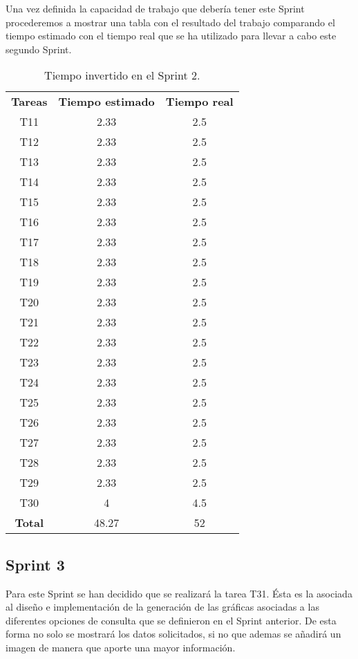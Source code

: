 Una vez definida la capacidad de trabajo que debería tener este Sprint procederemos a mostrar una tabla con el resultado del trabajo comparando el tiempo estimado con el tiempo real que se ha utilizado para llevar a cabo este segundo Sprint.

\begin{table}[H]
	\begin{center}
		\begin{tabular}{| c | c | c |}
			\hline

			\textbf{Tareas} & \textbf{Tiempo estimado} & \textbf{Tiempo real} \\
			T11 & 2.33 & 2.5 \\
			T12 & 2.33 & 2.5 \\
			T13 & 2.33 & 2.5 \\
			T14 & 2.33 & 2.5 \\
			T15 & 2.33 & 2.5 \\
			T16 & 2.33 & 2.5 \\
			T17 & 2.33 & 2.5 \\
			T18 & 2.33 & 2.5 \\
			T19 & 2.33 & 2.5 \\
			T20 & 2.33 & 2.5 \\
			T21 & 2.33 & 2.5 \\
			T22 & 2.33 & 2.5 \\
			T23 & 2.33 & 2.5 \\
			T24 & 2.33 & 2.5 \\
			T25 & 2.33 & 2.5 \\
			T26 & 2.33 & 2.5 \\
			T27 & 2.33 & 2.5 \\
			T28 & 2.33 & 2.5 \\
			T29 & 2.33 & 2.5 \\
			T30 & 4 & 4.5 \\
			\textbf{Total} & 48.27 & 52 \\ \hline
		\end{tabular}
		\caption{Tiempo invertido en el Sprint 2.}
	\end{center}
\end{table}

\subsection{Sprint 3}

Para este Sprint se han decidido que se realizará la tarea T31. Ésta es la asociada al diseño e implementación de la generación de las gráficas asociadas a las diferentes opciones de consulta que se definieron en el Sprint anterior. De esta forma no solo se mostrará los datos solicitados, si no que ademas se añadirá un imagen de manera que aporte una mayor información.


